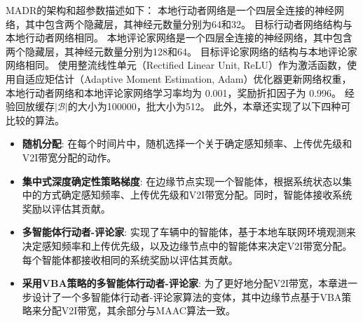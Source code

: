 MADR的架构和超参数描述如下：
本地行动者网络是一个四层全连接的神经网络，其中包含两个隐藏层，其神经元数量分别为64和32。
目标行动者网络结构与本地行动者网络相同。
本地评论家网络是一个四层全连接的神经网络，其中包含两个隐藏层，其神经元数量分别为128和64。
目标评论家网络的结构与本地评论家网络相同。
使用整流线性单元（Rectified Linear Unit, ReLU）作为激活函数，使用自适应矩估计（Adaptive Moment Estimation, Adam）优化器更新网络权重，本地行动者网络和本地评论家网络学习率均为 0.001，奖励折扣因子为 0.996。
经验回放缓存$|\mathcal{B}|$的大小为100000，批大小为512。
此外，本章还实现了以下四种可比较的算法。

\begin{itemize}
	\item \textbf{随机分配}: 在每个时间片中，随机选择一个关于确定感知频率、上传优先级和V2I带宽分配的动作。
	\item \textbf{集中式深度确定性策略梯度}\cite{mlika2022deep}: 在边缘节点实现一个智能体，根据系统状态以集中的方式确定感知频率、上传优先级和V2I带宽分配。同时，智能体接收系统奖励以评估其贡献。
	\item \textbf{多智能体行动者-评论家}\cite{he2021efficient}: 实现了车辆中的智能体，基于本地车联网环境观测来决定感知频率和上传优先级，以及边缘节点中的智能体来决定V2I带宽分配。每个智能体都接收相同的系统奖励以评估其贡献。
	\item \textbf{采用VBA策略的多智能体行动者-评论家}: 为了更好地分配V2I带宽，本章进一步设计了一个多智能体行动者-评论家算法的变体，其中边缘节点基于VBA策略来分配V2I带宽，其余部分与MAAC算法一致。
\end{itemize}

